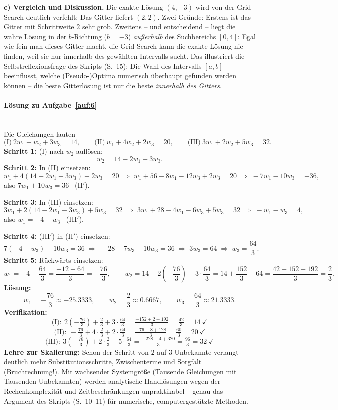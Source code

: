 \documentclass[11pt,a4paper]{scrartcl}
\begin{document}
\textbf{c) Vergleich und Diskussion.} Die exakte Lösung $(4, -3)$ wird von der Grid Search
deutlich verfehlt: Das Gitter liefert $(2, 2)$. Zwei Gründe: Erstens ist das Gitter mit
Schrittweite $2$ sehr grob. Zweitens -- und entscheidend -- liegt die wahre Lösung in der
$b$-Richtung ($b = -3$) \emph{außerhalb} des Suchbereichs $[0, 4]$: Egal wie fein man
dieses Gitter macht, die Grid Search kann die exakte Lösung nie finden, weil sie nur
innerhalb des gewählten Intervalls sucht. Das illustriert die Selbstreflexionsfrage des
Skripts (S.~15): Die Wahl des Intervalls $[a,b]$ beeinflusst, welche (Pseudo-)Optima
numerisch überhaupt gefunden werden können -- die beste Gitterlösung ist nur die beste
\emph{innerhalb des Gitters}.

\paragraph{Lösung zu Aufgabe~\ref{auf:6}}\mbox{}\\[2pt]
Die Gleichungen lauten
\[
\text{(I)}\ 2w_1 + w_2 + 3w_3 = 14, \qquad
\text{(II)}\ w_1 + 4w_2 + 2w_3 = 20, \qquad
\text{(III)}\ 3w_1 + 2w_2 + 5w_3 = 32 .
\]
\textbf{Schritt 1:} (I) nach $w_2$ auflösen:
\[
w_2 = 14 - 2w_1 - 3w_3 .
\]
\textbf{Schritt 2:} In (II) einsetzen:
\[
w_1 + 4(14 - 2w_1 - 3w_3) + 2w_3 = 20
\;\Rightarrow\;
w_1 + 56 - 8w_1 - 12w_3 + 2w_3 = 20
\;\Rightarrow\;
-7w_1 - 10w_3 = -36,
\]
also $7w_1 + 10w_3 = 36$ \ (II$'$).

\textbf{Schritt 3:} In (III) einsetzen:
\[
3w_1 + 2(14 - 2w_1 - 3w_3) + 5w_3 = 32
\;\Rightarrow\;
3w_1 + 28 - 4w_1 - 6w_3 + 5w_3 = 32
\;\Rightarrow\;
-w_1 - w_3 = 4,
\]
also $w_1 = -4 - w_3$ \ (III$'$).

\textbf{Schritt 4:} (III$'$) in (II$'$) einsetzen:
\[
7(-4 - w_3) + 10w_3 = 36
\;\Rightarrow\;
-28 - 7w_3 + 10w_3 = 36
\;\Rightarrow\;
3w_3 = 64
\;\Rightarrow\;
w_3 = \frac{64}{3} .
\]
\textbf{Schritt 5:} Rückwärts einsetzen:
\[
w_1 = -4 - \frac{64}{3} = \frac{-12 - 64}{3} = -\frac{76}{3}, \qquad
w_2 = 14 - 2\left(-\frac{76}{3}\right) - 3 \cdot \frac{64}{3}
    = 14 + \frac{152}{3} - 64 = \frac{42 + 152 - 192}{3} = \frac{2}{3} .
\]
\textbf{Lösung:}
\[
w_1 = -\frac{76}{3} \approx -25.3333, \qquad
w_2 = \frac{2}{3} \approx 0.6667, \qquad
w_3 = \frac{64}{3} \approx 21.3333 .
\]
\textbf{Verifikation:}
\[
\text{(I)}:\ 2\left(-\tfrac{76}{3}\right) + \tfrac{2}{3} + 3 \cdot \tfrac{64}{3}
= \tfrac{-152 + 2 + 192}{3} = \tfrac{42}{3} = 14\ \checkmark
\]
\[
\text{(II)}:\ -\tfrac{76}{3} + 4 \cdot \tfrac{2}{3} + 2 \cdot \tfrac{64}{3}
= \tfrac{-76 + 8 + 128}{3} = \tfrac{60}{3} = 20\ \checkmark
\]
\[
\text{(III)}:\ 3\left(-\tfrac{76}{3}\right) + 2 \cdot \tfrac{2}{3} + 5 \cdot \tfrac{64}{3}
= \tfrac{-228 + 4 + 320}{3} = \tfrac{96}{3} = 32\ \checkmark
\]
\textbf{Lehre zur Skalierung:} Schon der Schritt von $2$ auf $3$ Unbekannte verlangt
deutlich mehr Substitutionsschritte, Zwischenterme und Sorgfalt (Bruchrechnung!). Mit
wachsender Systemgröße (Tausende Gleichungen mit Tausenden Unbekannten) werden analytische
Handlösungen wegen der Rechenkomplexität und Zeitbeschränkungen unpraktikabel -- genau das
Argument des Skripts (S.~10--11) für numerische, computergestützte Methoden.
\end{document}

